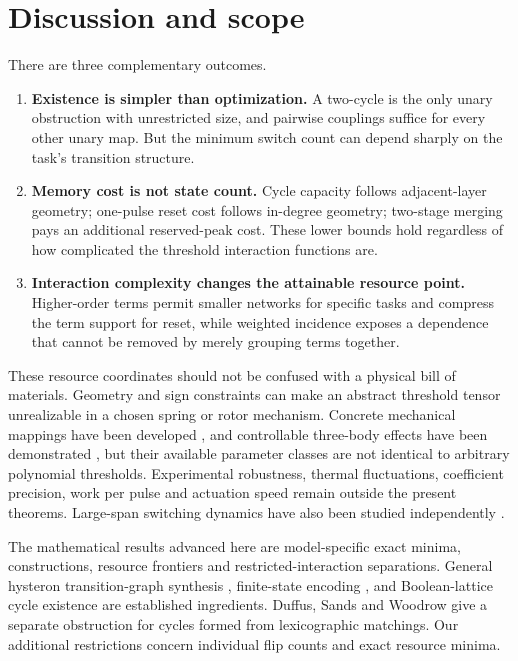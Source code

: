 \documentclass[12pt,letterpaper]{article}
\theoremstyle{definition}\newtheorem{definition}[theorem]{Definition}
\theoremstyle{remark}\newtheorem{remark}[theorem]{Remark}
\begin{document}
\section{Discussion and scope}\label{sec:discussion}
There are three complementary outcomes.
\begin{enumerate}
\item \textbf{Existence is simpler than optimization.} A two-cycle is the only unary obstruction with unrestricted size, and pairwise couplings suffice for every other unary map. But the minimum switch count can depend sharply on the task's transition structure.
\item \textbf{Memory cost is not state count.} Cycle capacity follows adjacent-layer geometry; one-pulse reset cost follows in-degree geometry; two-stage merging pays an additional reserved-peak cost. These lower bounds hold regardless of how complicated the threshold interaction functions are.
\item \textbf{Interaction complexity changes the attainable resource point.} Higher-order terms permit smaller networks for specific tasks and compress the term support for reset, while weighted incidence exposes a dependence that cannot be removed by merely grouping terms together.
\end{enumerate}

These resource coordinates should not be confused with a physical bill of materials. Geometry and sign constraints can make an abstract threshold tensor unrealizable in a chosen spring or rotor mechanism. Concrete mechanical mappings have been developed \citep{shohat2025,paulsen2026}, and controllable three-body effects have been demonstrated \citep{ali2026}, but their available parameter classes are not identical to arbitrary polynomial thresholds. Experimental robustness, thermal fluctuations, coefficient precision, work per pulse and actuation speed remain outside the present theorems. Large-span switching dynamics have also been studied independently \citep{teunisse2026span}.

The mathematical results advanced here are model-specific exact minima, constructions, resource frontiers and restricted-interaction separations. General hysteron transition-graph synthesis \citep{teunisse2025}, finite-state encoding \citep{ahmad2000}, and Boolean-lattice cycle existence \citep{mutzesu2017,mutze2016} are established ingredients. Duffus, Sands and Woodrow \citep{duffus1988} give a separate obstruction for cycles formed from lexicographic matchings. Our additional restrictions concern individual flip counts and exact resource minima.
\end{document}
